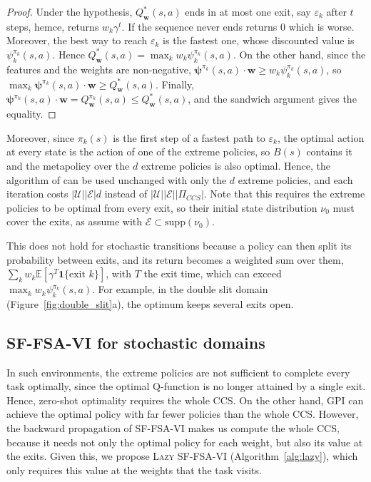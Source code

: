 \documentclass[11pt]{article}
\newcommand{\vpsi}{\bm{\psi}}      %
\begin{document}
\begin{proof}
    Under the hypothesis, $Q^*_{\mathbf{w}}(s,a)$ ends in at most one exit, say $\varepsilon_k$ after $t$ steps, hemce, returns $w_k \gamma^t$. If the sequence never ends returns $0$ which is worse. Moreover, the best way to reach $\varepsilon_k$ is the fastest one, whose discounted value is $\psi^{\pi_k}_k(s,a)$. Hence $Q^*_{\mathbf{w}}(s,a) = \max_k w_k \psi^{\pi_k}_k(s,a)$. On the other hand, since the features and the weights are non-negative, $\vpsi^{\pi_k}(s,a) \cdot \mathbf{w} \geq w_k \psi^{\pi_k}_k(s,a)$, so $\max_k \vpsi^{\pi_k}(s,a) \cdot \mathbf{w} \geq Q^*_{\mathbf{w}}(s,a)$. Finally, $\vpsi^{\pi_k}(s,a) \cdot \mathbf{w} = Q^{\pi_k}_{\mathbf{w}}(s,a) \leq Q^*_{\mathbf{w}}(s,a)$, and the sandwich argument gives the equality. 
\end{proof}

Moreover, since $\pi_k(s)$ is the first step of a fastest path to $\varepsilon_k$, the optimal action at every state is the action of one of the extreme policies, so $B(s)$ contains it and the metapolicy over the $d$ extreme policies is also optimal. Hence, the algorithm of \cite{kuric_planning_2024} can be used unchanged with only the $d$ extreme policies, and each iteration costs $|\mathcal{U}||\mathcal{E}|d$ instead of $|\mathcal{U}||\mathcal{E}||\Pi_{CCS}|$. Note that this requires the extreme policies to be optimal from every exit, so their initial state distribution $\nu_0$ must cover the exits, as \cite{kuric_planning_2024} assume with $\mathcal{E} \subset \mathrm{supp}(\nu_0)$. 

This does not hold for stochastic transitions because a policy can then split its probability between exits, and its return becomes a weighted sum over them, $\sum_k w_k \mathbb{E}[\gamma^{T}\mathbf{1}\{\text{exit } k\}]$, with $T$ the exit time, which can exceed $\max_k w_k  \psi^{\pi_k}_k(s,a)$. For example, in the double slit domain (Figure~\ref{fig:double_slit}a), the optimum keeps several exits open. 

\subsection{SF-FSA-VI for stochastic domains}

In such environments, the extreme policies are not sufficient to complete every task optimally, since the optimal Q-function is no longer attained by a single exit. Hence, zero-shot optimality requires the whole CCS. On the other hand, GPI can achieve the optimal policy with far fewer policies than the whole CCS. However, the backward propagation of SF-FSA-VI makes us compute the whole CCS, because it needs not only the optimal policy for each weight, but also its value at the exits. Given this, we propose \textsc{Lazy SF-FSA-VI} (Algorithm~\ref{alg:lazy}), which only requires this value at the weights that the task visits.
\end{document}
